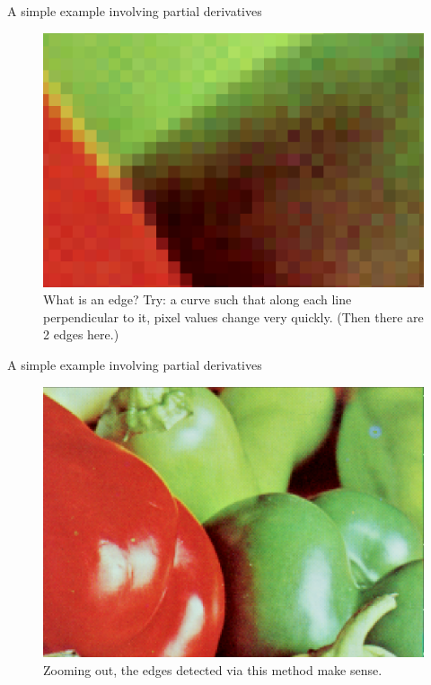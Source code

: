 \documentclass{beamer}
\begin{document}
\begin{frame}{A simple example involving partial derivatives}
    
    \begin{figure}[h!]
            \centering            \includegraphics[scale=0.15]{edgedet2.png}
            \caption{What is an edge? Try: a curve such that along each line perpendicular to it, pixel values change very quickly. (Then there are 2 edges here.)}
    \end{figure}

\end{frame}

\begin{frame}{A simple example involving partial derivatives}
    
    \begin{figure}[h!]
            \centering            \includegraphics[scale=0.15]{edgedet1.png}
            \caption{Zooming out, the edges detected via this method make sense.}
    \end{figure}

\end{frame}
\end{document}
